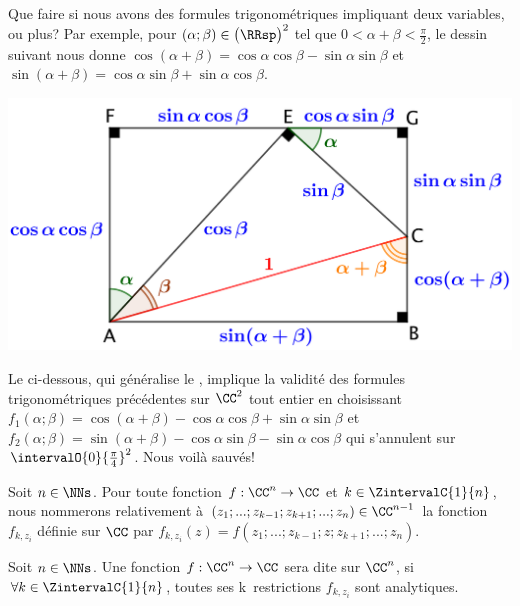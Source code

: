 Que faire si nous avons des formules trigonométriques impliquant deux variables, ou plus?
Par exemple,
pour
$(\alpha ; \beta) \in \big( \RRsp \big)^2$ tel que $0 < \alpha + \beta < \frac{\pi}{2}$,
le dessin suivant nous donne
$\cos(\alpha + \beta) = \cos \alpha \cos \beta - \sin \alpha \sin \beta$
et
$\sin(\alpha + \beta) = \cos \alpha \sin \beta + \sin \alpha \cos \beta$.%

\begin{center}
	\includegraphics[scale=.7]{add-trigo-formulas.png}
\end{center}

Le  ci-dessous, qui généralise le , implique la validité des formules trigonométriques précédentes sur $\CC^2$ tout entier en choisissant
$f_1(\alpha ; \beta) = \cos(\alpha + \beta) - \cos \alpha \cos \beta + \sin \alpha \sin \beta$
et
$f_2(\alpha ; \beta) = \sin(\alpha + \beta) - \cos \alpha \sin \beta - \sin \alpha \cos \beta$
qui s'annulent sur $\intervalO{0}{\frac{\pi}{4}}^2$.
Nous voilà sauvés!




\begin{defi}
    Soit $n \in \NNs$.
    Pour toute fonction $f: \CC^n \rightarrow \CC$
    et
    $k \in \ZintervalC{1}{n}$,
    nous nommerons  relativement à $(z_1 ; ... ; z_{k-1} ; z_{k+1} ; ... ; z_n) \in \CC^{n-1}$ 
    la fonction $f_{k , z_i}$ définie sur $\CC$ par
    $f_{k , z_i}(z) = f(z_1 ; ... ; z_{k-1} ; z ; z_{k+1} ; ... ; z_n)$.
\end{defi}


\begin{defi}
    Soit $n \in \NNs$.
    Une fonction $f: \CC^n \rightarrow \CC$ sera dite  sur $\CC^n$,
    si $\forall k \in \ZintervalC{1}{n}$,
    toutes ses k\iemes\ restrictions $f_{k , z_i}$ sont analytiques.
\end{defi}


